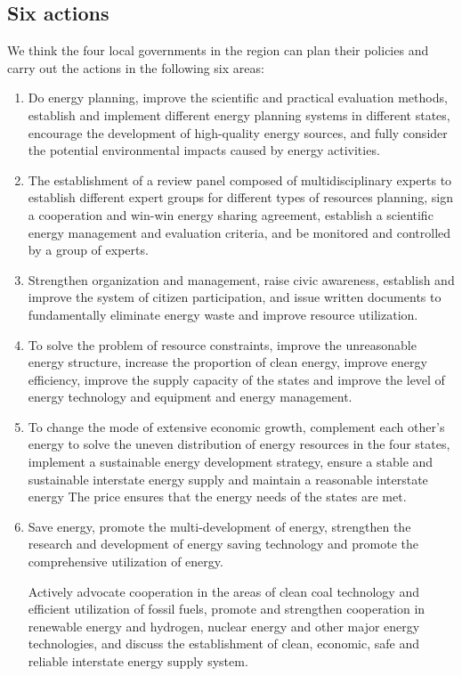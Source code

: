 \documentclass[a4paper]{article}
\begin{document}
\subsection{Six actions}
We think the four local governments in the region can plan their policies and carry out the actions in the following six areas:
\begin{enumerate}
\item Do energy planning, improve the scientific and practical evaluation methods, establish and implement different energy planning systems in different states, encourage the development of high-quality energy sources, and fully consider the potential environmental impacts caused by energy activities.
\item The establishment of a review panel composed of multidisciplinary experts to establish different expert groups for different types of resources planning, sign a cooperation and win-win energy sharing agreement, establish a scientific energy management and evaluation criteria, and be monitored and controlled by a group of experts.
\item Strengthen organization and management, raise civic awareness, establish and improve the system of citizen participation, and issue written documents to fundamentally eliminate energy waste and improve resource utilization.
\item To solve the problem of resource constraints, improve the unreasonable energy structure, increase the proportion of clean energy, improve energy efficiency, improve the supply capacity of the states and improve the level of energy technology and equipment and energy management.
\item To change the mode of extensive economic growth, complement each other's energy to solve the uneven distribution of energy resources in the four states, implement a sustainable energy development strategy, ensure a stable and sustainable interstate energy supply and maintain a reasonable interstate energy The price ensures that the energy needs of the states are met.

\item Save energy, promote the multi-development of energy, strengthen the research and development of energy saving technology and promote the comprehensive utilization of energy.

Actively advocate cooperation in the areas of clean coal technology and efficient utilization of fossil fuels, promote and strengthen cooperation in renewable energy and hydrogen, nuclear energy and other major energy technologies, and discuss the establishment of clean, economic, safe and reliable interstate energy supply system.
\end{enumerate}
\end{document}
